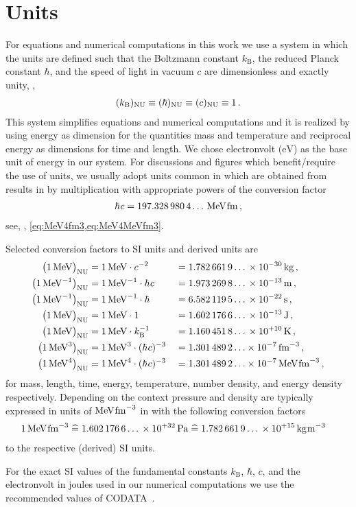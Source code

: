 \section{Units}
For equations and numerical computations in this work we use a \nun{} system in which the units are defined such that the Boltzmann constant $k_\mathrm{B}$, the reduced Planck constant $\hbar$, and the speed of light in vacuum $c$ are dimensionless and exactly unity, \ie{},
\begin{align}
	(k_\mathrm{B})_\mathrm{NU}  \equiv  (\hbar)_\mathrm{NU}  \equiv  (c)_\mathrm{NU}  \equiv  1 \, .
\end{align}
This \nun{} system simplifies equations and numerical computations and it is realized by using energy as dimension for the quantities mass and temperature and reciprocal energy as dimensions for time and length.
We chose electronvolt ($\mathrm{eV}$) as the base unit of energy in our \nun{} system.
For discussions and figures which benefit/require the use of units, we usually adopt units common in \hep{} which are obtained from results in \nun{} by multiplication with appropriate powers of the conversion factor
\begin{align}
	\hbar\mkern1.0mu c = 197.328\,980\,4\ldots\, \mathrm{MeV}\mkern1.0mu\mathrm{fm} \,,
\end{align}
see, \eg{}, \cref{eq:MeV4fm3,eq:MeV4MeVfm3}.

Selected conversion factors to SI units and derived units are
\begin{alignat}{2}
	\big(1\,\mathrm{MeV}\big)_\mathrm{NU} &= 1\,\mathrm{MeV} \cdot c^{-2} &&= 1.782\,661\,9\ldots\,\times10^{-30}\,\mathrm{kg} \, ,\\
	\big(1\,\mathrm{MeV}^{-1}\big)_\mathrm{NU} &= 1\,\mathrm{MeV}^{-1} \cdot \hbar\mkern1.0mu c &&= 1.973\,269\,8\ldots\,\times10^{-13}\,\mathrm{m} \, ,\\
	\big(1\,\mathrm{MeV}^{-1}\big)_\mathrm{NU} &= 1\,\mathrm{MeV}^{-1} \cdot \hbar &&= 6.582\,119\,5\ldots\,\times10^{-22}\,\mathrm{s} \, ,\\
	\big(1\,\mathrm{MeV}\big)_\mathrm{NU} &= 1\,\mathrm{MeV} \cdot 1&&= 1.602\,176\,6\ldots\,\times10^{-13}\,\mathrm{J} \, ,\\
	\big(1\,\mathrm{MeV}\big)_\mathrm{NU} &= 1\,\mathrm{MeV} \cdot k_\mathrm{B}^{-1} &&= 1.160\,451\,8\ldots\,\times10^{+10}\,\mathrm{K} \, ,\\
	\big(1\,\mathrm{MeV}^3\big)_\mathrm{NU} &= 1\,\mathrm{MeV}^3 \cdot (\hbar\mkern1.0mu c)^{-3} &&= 1.301\,489\,2\ldots \times10^{-7}\,\mathrm{fm}^{-3} \, , \label{eq:MeV4fm3}\\
	\big(1\,\mathrm{MeV}^4\big)_\mathrm{NU} &= 1\,\mathrm{MeV}^4 \cdot (\hbar\mkern1.0mu c)^{-3} &&= 1.301\,489\,2\ldots \times10^{-7}\,\mathrm{MeV}\mkern1.0mu\mathrm{fm}^{-3} \, ,\label{eq:MeV4MeVfm3}
\end{alignat}
for mass, length, time, energy, temperature, number density, and energy density respectively.
Depending on the context pressure and density are typically expressed in units of $\mathrm{MeV}\mkern1.0mu\mathrm{fm}^{-3}$ in \hep{} with the following conversion factors
\begin{align}
	1\,\MeVfmIII& \mathrel{\widehat{=}} 1.602\,176\,6\ldots\,\times10^{+32}\,\mathrm{Pa}%
	\mathrel{\widehat{=}} 1.782\,661\,9\ldots\,\times 10^{+15}\, \mathrm{kg}\mkern1.0mu\mathrm{m}^{-3}
\end{align}
to the respective (derived) SI units. 

For the exact SI values of the fundamental constants \dash{} \viz{} $k_\mathrm{B}$, $\hbar$, $c$, and the electronvolt in joules \dash{} used in our numerical computations we use the recommended values of CODATA~\cite{CODATA2018}.